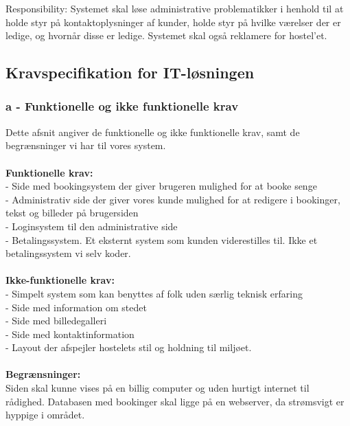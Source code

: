 \documentclass[12pt,a4paper]{article}
\begin{document}
Responsibility: Systemet skal løse administrative problematikker i henhold til at holde styr på kontaktoplysninger af kunder, holde styr på hvilke værelser der er ledige, og hvornår disse er ledige. Systemet skal også reklamere for hostel'et.
\subsection{Kravspecifikation for IT-løsningen}
\subsubsection{a - Funktionelle og ikke funktionelle krav}
Dette afsnit angiver de funktionelle og ikke funktionelle krav, samt de begrænsninger vi har til vores system.\\\\
\textbf{Funktionelle krav:} \\
- Side med bookingsystem der giver brugeren mulighed for at booke senge\\
- Administrativ side der giver vores kunde mulighed for at redigere i bookinger, tekst og billeder på brugersiden\\
- Loginsystem til den administrative side\\
- Betalingssystem. Et eksternt system som kunden viderestilles til. Ikke et betalingssystem vi selv koder.\\\\
       \textbf{Ikke-funktionelle krav:} \\
- Simpelt system som kan benyttes af folk uden særlig teknisk erfaring\\
- Side med information om stedet\\
- Side med billedegalleri\\
- Side med kontaktinformation\\
- Layout der afspejler hostelets stil og holdning til miljøet. \\\\
      \textbf{Begrænsninger:} \\
	Siden skal kunne vises på en billig computer og uden hurtigt internet til rådighed. Databasen med bookinger skal ligge på en webserver, da strømsvigt er hyppige i området.
\newpage
\end{document}
